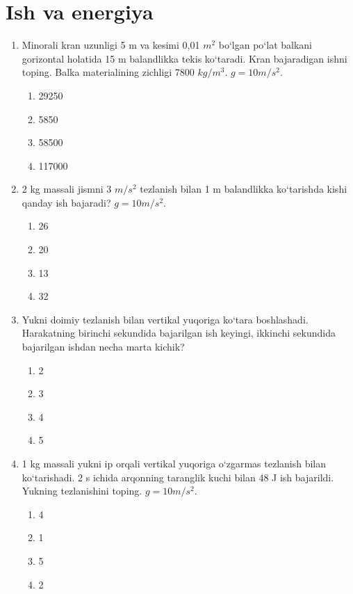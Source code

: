 \section{Ish va energiya}

\begin{enumerate}

\item Minorali kran uzunligi 5 m va kesimi 0,01 $m^2$ bo‘lgan po‘lat balkani gorizontal holatida 15 m balandlikka tekis ko‘taradi. Kran bajaradigan ishni toping. Balka materialining zichligi 7800 $kg/m^3$. $g = 10 m/s^2$.
\begin{enumerate}[label=\Alph*)]
\item 29250
\item 5850
\item 58500
\item 117000
\end{enumerate}

\item 2 kg massali jismni 3 $m/s^2$ tezlanish bilan 1 m balandlikka ko‘tarishda kishi qanday ish bajaradi? $g = 10 m/s^2$.
\begin{enumerate}[label=\Alph*)]
\item 26
\item 20
\item 13
\item 32
\end{enumerate}

\item Yukni doimiy tezlanish bilan vertikal yuqoriga ko‘tara boshlashadi. Harakatning birinchi sekundida bajarilgan ish keyingi, ikkinchi sekundida bajarilgan ishdan necha marta kichik?
\begin{enumerate}[label=\Alph*)]
\item 2
\item 3
\item 4
\item 5
\end{enumerate}

\item 1 kg massali yukni ip orqali vertikal yuqoriga o‘zgarmas tezlanish bilan ko‘tarishadi. 2 s ichida arqonning taranglik kuchi bilan 48 J ish bajarildi. Yukning tezlanishini toping. $g = 10 m/s^2$.
\begin{enumerate}[label=\Alph*)]
\item 4
\item 1
\item 5
\item 2
\end{enumerate}


\end{enumerate}
